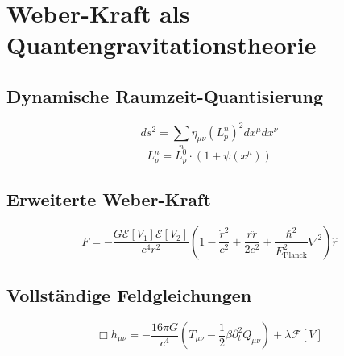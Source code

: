 \section{Weber-Kraft als Quantengravitationstheorie}

\subsection{Dynamische Raumzeit-Quantisierung}
\[
ds^2 = \sum_{n} \eta_{\mu\nu} (L_p^n)^2 dx^\mu dx^\nu
\]
\[
L_p^n = L_p^0 \cdot (1 + \psi(x^\mu))
\]

\subsection{Erweiterte Weber-Kraft}
\[
F = -\frac{G \mathcal{E}[V_1] \mathcal{E}[V_2]}{c^4 r^2} \left(1 - \frac{\dot{r}^2}{c^2} + \frac{r \ddot{r}}{2c^2} + \frac{\hbar^2}{E_{\text{Planck}}^2} \nabla^2 \right) \hat{r}
\]

\subsection{Vollständige Feldgleichungen}
\[
\Box h_{\mu\nu} = -\frac{16\pi G}{c^4} \left( T_{\mu\nu} - \frac{1}{2} \beta \partial_t^2 Q_{\mu\nu} \right) + \lambda \mathcal{F}[V]
\]